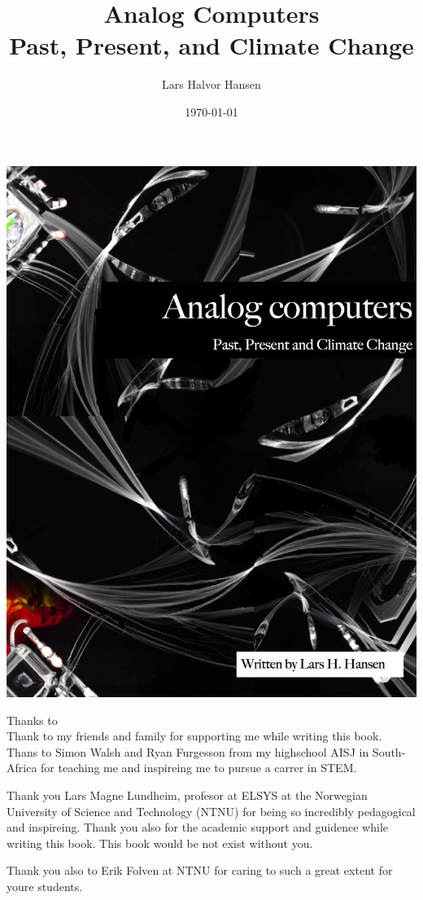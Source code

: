 \documentclass{report}
\title{Analog Computers \\ 
    \Large{Past, Present, and Climate Change}}
\author{Lars Halvor Hansen}
\date{\today}
\begin{document}
\includegraphics[scale=0.4]{ACPPCbookCover.jpg}
\pagestyle{classicbookstyle} %



\newpage
\maketitle
\tableofcontents
\newpage
\Large{Thanks to}\\
Thank to my friends and family for supporting me while writing this book. Thans to Simon Walsh and Ryan Furgesson from my highschool AISJ in South-Africa for teaching me and inspireing me to pursue a carrer in STEM. 

Thank you Lars Magne Lundheim, profesor at ELSYS at the Norwegian University of Science and Technology (NTNU) for being so incredibly pedagogical and inspireing. Thank you also for the academic support and guidence while writing this book. This book would be not exist without you. 

Thank you also to Erik Folven at NTNU for caring to such a great extent for youre students. 
\end{document}
